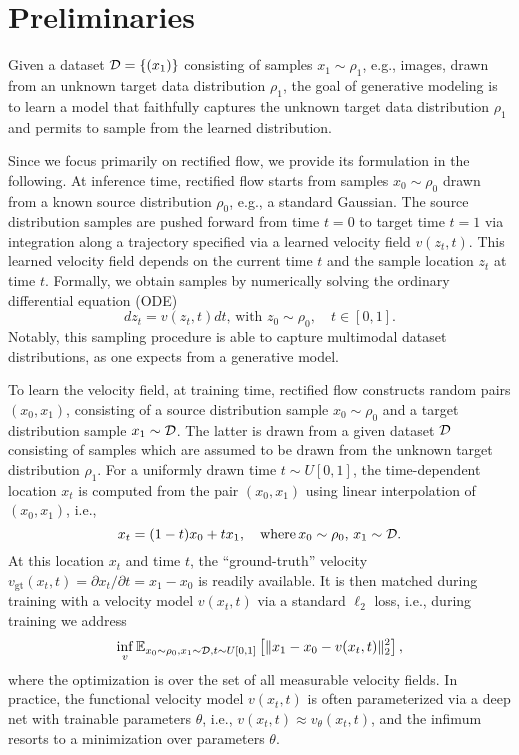 \section{Preliminaries}
\label{sec:prelim}

Given a dataset ${\cal D} = \{(x_1)\}$ consisting of samples $x_1\sim\rho_1$, e.g., images, drawn from an unknown target data distribution $\rho_1$, the goal of generative modeling is to learn a model that faithfully captures the unknown target data distribution $\rho_1$ and permits to sample from the learned distribution. %

Since we focus primarily on rectified flow, we provide its formulation in the following. %
At inference time, 
rectified flow starts from samples $x_0\sim\rho_0$ drawn from a known source distribution $\rho_0$, e.g., a standard Gaussian. The source distribution samples are pushed forward from time $t=0$ to target time $t=1$ via integration along a trajectory specified via a learned velocity field $v(z_t,t)$. This learned velocity field depends on the current time $t$ and the sample location $z_t$ at time $t$. Formally, we obtain samples by numerically solving the ordinary differential equation (ODE)
\begin{equation}
    \label{eq:RF}
    d z_t = v (z_t, t) dt, \, \text{with }z_0 \sim \rho_0, \quad t \in [0, 1]. 
\end{equation}
Notably, this sampling procedure is able to capture multimodal dataset distributions, as one expects from a generative model.

To learn the velocity field, at training time, rectified flow constructs random pairs $(x_0,x_1)$, consisting of a source distribution sample $x_0\sim\rho_0$ and a target distribution sample $x_1\sim{\cal D}$. The latter is drawn from a given dataset ${\cal D}$ consisting of samples which are assumed to be drawn from the unknown target distribution $\rho_1$. For a uniformly drawn time $t\sim U[0,1]$, the time-dependent location $x_t$ %
is computed from the pair $(x_0,x_1)$ using linear interpolation of $(x_0, x_1)$, i.e., 
\begin{equation}
\label{eq:lin_int}
x_t = (1-t)x_0 + tx_1, \quad \text{where} \, x_0 \sim \rho_0, \, x_1 \sim {\cal D}.
\end{equation}
At this location $x_t$ and time $t$, the ``ground-truth'' velocity $v_\text{gt}(x_t,t) = \partial x_t/\partial t = x_1 - x_0$ is readily available. It is then matched during training with a velocity model $v(x_t,t)$ via a standard $\ell_2$ loss, i.e., during training we address
\begin{equation}
\label{eq:lin_rect_flow}
\inf_{v} \mathbb{E}_{x_0\sim\rho_0,x_1\sim{\cal D},t\sim U[0,1]}\left[\| x_1 - x_0 - v(x_t,t) \|^2_2 \right],
\end{equation}
where the optimization is over the set of all measurable velocity fields. 
In practice, the functional velocity model $v(x_t,t)$ is often parameterized via a deep net with trainable parameters $\theta$, i.e., $v(x_t,t)\approx v_\theta(x_t,t)$, and the infimum resorts to a minimization over parameters $\theta$.

